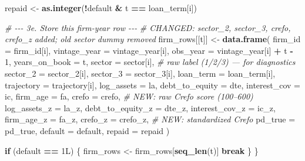 \documentclass[
]{article}
\newenvironment{Shaded}{\begin{snugshade}}{\end{snugshade}}
\newcommand{\AttributeTok}[1]{\textcolor[rgb]{0.13,0.29,0.53}{#1}}
\newcommand{\CommentTok}[1]{\textcolor[rgb]{0.56,0.35,0.01}{\textit{#1}}}
\newcommand{\ControlFlowTok}[1]{\textcolor[rgb]{0.13,0.29,0.53}{\textbf{#1}}}
\newcommand{\DataTypeTok}[1]{\textcolor[rgb]{0.13,0.29,0.53}{#1}}
\newcommand{\DecValTok}[1]{\textcolor[rgb]{0.00,0.00,0.81}{#1}}
\newcommand{\FunctionTok}[1]{\textcolor[rgb]{0.13,0.29,0.53}{\textbf{#1}}}
\newcommand{\NormalTok}[1]{#1}
\newcommand{\OtherTok}[1]{\textcolor[rgb]{0.56,0.35,0.01}{#1}}
\newcommand{\SpecialCharTok}[1]{\textcolor[rgb]{0.81,0.36,0.00}{\textbf{#1}}}
\begin{document}
\begin{Shaded}
\begin{Highlighting}[]
\NormalTok{      repaid }\OtherTok{\textless{}{-}} \FunctionTok{as.integer}\NormalTok{(}\SpecialCharTok{!}\NormalTok{default }\SpecialCharTok{\&}\NormalTok{ t }\SpecialCharTok{==}\NormalTok{ loan\_term[i])}
      
      \CommentTok{\# {-}{-}{-} 3e. Store this firm{-}year row {-}{-}{-}}
      \CommentTok{\# CHANGED: sector\_2, sector\_3, crefo, crefo\_z added; old sector dummy removed}
\NormalTok{      firm\_rows[[t]] }\OtherTok{\textless{}{-}} \FunctionTok{data.frame}\NormalTok{(}
        \AttributeTok{firm\_id          =}\NormalTok{ firm\_id[i],}
        \AttributeTok{vintage\_year     =}\NormalTok{ vintage\_year[i],}
        \AttributeTok{obs\_year         =}\NormalTok{ vintage\_year[i] }\SpecialCharTok{+}\NormalTok{ t }\SpecialCharTok{{-}} \DecValTok{1}\NormalTok{,}
        \AttributeTok{years\_on\_book    =}\NormalTok{ t,}
        \AttributeTok{sector           =}\NormalTok{ sector[i],      }\CommentTok{\# raw label (1/2/3) — for diagnostics}
        \AttributeTok{sector\_2         =}\NormalTok{ sector\_2[i],}
        \AttributeTok{sector\_3         =}\NormalTok{ sector\_3[i],}
        \AttributeTok{loan\_term        =}\NormalTok{ loan\_term[i],}
        \AttributeTok{trajectory       =}\NormalTok{ trajectory[i],}
        \AttributeTok{log\_assets       =}\NormalTok{ la,}
        \AttributeTok{debt\_to\_equity   =}\NormalTok{ dte,}
        \AttributeTok{interest\_cov     =}\NormalTok{ ic,}
        \AttributeTok{firm\_age         =}\NormalTok{ fa,}
        \AttributeTok{crefo            =}\NormalTok{ crefo,          }\CommentTok{\# NEW: raw Crefo score (100–600)}
        \AttributeTok{log\_assets\_z     =}\NormalTok{ la\_z,}
        \AttributeTok{debt\_to\_equity\_z =}\NormalTok{ dte\_z,}
        \AttributeTok{interest\_cov\_z   =}\NormalTok{ ic\_z,}
        \AttributeTok{firm\_age\_z       =}\NormalTok{ fa\_z,}
        \AttributeTok{crefo\_z          =}\NormalTok{ crefo\_z,        }\CommentTok{\# NEW: standardized Crefo}
        \AttributeTok{pd\_true          =}\NormalTok{ pd\_true,}
        \AttributeTok{default          =}\NormalTok{ default,}
        \AttributeTok{repaid           =}\NormalTok{ repaid}
\NormalTok{      )}
      
      \ControlFlowTok{if}\NormalTok{ (default }\SpecialCharTok{==} \DecValTok{1}\DataTypeTok{L}\NormalTok{) \{}
\NormalTok{        firm\_rows }\OtherTok{\textless{}{-}}\NormalTok{ firm\_rows[}\FunctionTok{seq\_len}\NormalTok{(t)]}
        \ControlFlowTok{break}
\NormalTok{      \}}
\NormalTok{    \}}
    

\end{Highlighting}
\end{Shaded}
\end{document}
